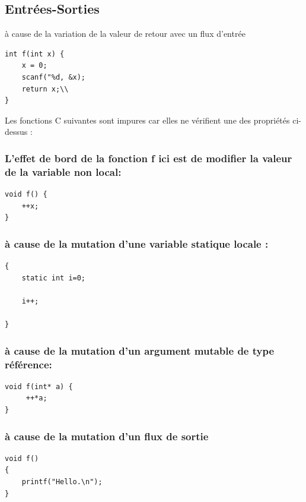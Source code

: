 \documentclass[12pt,titlepage]{article}
\begin{document}
\subsection{Entrées-Sorties}

à cause de la variation de la valeur de retour avec un flux d'entrée

\begin{lstlisting}
int f(int x) {
    x = 0;
    scanf("%d, &x);
    return x;\\
}
\end{lstlisting}

Les fonctions C suivantes sont impures car elles ne vérifient une des propriétés ci-dessus :

\subsubsection{L'effet de bord de la fonction f ici est de modifier la valeur de la variable non local:}

\begin{lstlisting}
void f() {
    ++x;
}
\end{lstlisting}

\subsubsection{ à cause de la mutation d'une variable statique locale :}

\begin{lstlisting}
{
    static int i=0; 

    i++;
    
}
\end{lstlisting}



\subsubsection{à cause de la mutation d'un argument mutable de type référence:}

\begin{lstlisting}
void f(int* a) {
     ++*a;
}
\end{lstlisting}

\subsubsection {à cause de la mutation d'un flux de sortie}

\begin{lstlisting}
void f()
{
    printf("Hello.\n");
}
\end{lstlisting}
\end{document}
